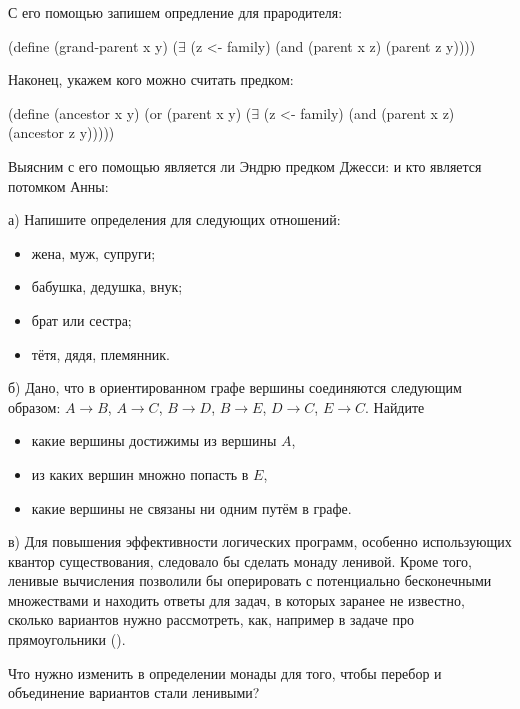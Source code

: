 С его помощью запишем опредление для прародителя:
\begin{Definition}[emph={x,y,z}]
(define (grand-parent x y)
  ($\exists$ (z <- family) (and (parent x z)
                        (parent z y))))
\end{Definition}

Наконец, укажем кого можно считать предком:
\begin{Definition}[emph={x,y,z}]
(define (ancestor x y) 
  (or (parent x y)
      ($\exists$ (z <- family) (and (parent x z)
                            (ancestor z y)))))  
\end{Definition}

Выясним с его помощью является ли Эндрю предком Джесси:
и кто является потомком Анны:

\begin{Assignment}
а)  Напишите определения для следующих отношений:
\begin{itemize}
  \item жена, муж, супруги;
  \item бабушка, дедушка,  внук;
  \item брат или сестра;
  \item тётя, дядя, племянник.
\end{itemize}

\medskip
б)  Дано, что в ориентированном графе вершины соединяются следующим образом: $A\to B$, $A\to C$, $B\to D$, $B\to E$, $D\to C$, $E\to C$. Найдите
\begin{itemize}
\item какие вершины достижимы из вершины $A$,
\item из каких вершин множно попасть в $E$,
\item какие вершины не связаны ни одним путём в графе.
\end{itemize}

\medskip
в) Для повышения эффективности логических программ, особенно использующих квантор существования, следовало бы сделать монаду  ленивой. Кроме того, ленивые вычисления позволили бы оперировать с потенциально бесконечными множествами и находить ответы для задач, в которых заранее не известно, сколько вариантов нужно рассмотреть, как, например в задаче про прямоугольники ().

Что нужно изменить в определении монады для того, чтобы перебор и объединение вариантов стали ленивыми?
\end{Assignment}

